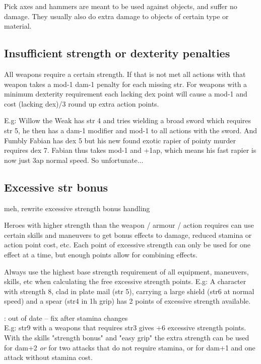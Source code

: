 Pick axes and hammers are meant to be used against objects, and suffer no damage. They usually also do extra damage to objects of certain type or material.


\subsection*{Insufficient strength or dexterity penalties}
All weapons require a certain strength. If that is not met all actions with that weapon takes a mod-1 dam-1 penalty for each missing str. For weapons with a minimum dexterity requirement each lacking dex point will cause a mod-1 and cost (lacking dex)/3 round up extra action points.

E.g: Willow the Weak has str 4 and tries wielding a broad sword which requires str 5, he then has a dam-1 modifier and mod-1 to all actions with the sword.
And Fumbly Fabian has dex 5 but his new found exotic rapier of pointy murder requires dex 7. Fabian thus takes mod-1 and +1ap, which means his fast rapier is now just 3ap normal speed. So unfortunate...


\subsection*{Excessive str bonus}
\todo meh, rewrite excessive strength bonus handling

Heroes with higher strength than the weapon / armour / action requires can use certain skills and maneuvers to get bonus effects to damage, reduced stamina or action point cost, etc. Each point of excessive strength can only be used for one effect at a time, but enough points allow for combining effects.

Always use the highest base strength requirement of all equipment, maneuvers, skills, etc when calculating the free excessive strength points.
E.g: A character with strength 8, clad in plate mail (str 5), carrying a large shield (str6 at normal speed) and a spear (str4 in 1h grip) has 2 points of excessive strength available.

\todo: out of date -- fix after stamina changes\\
E.g: str9 with a weapons that requires str3 gives +6 excessive strength points. With the skills "strength bonus" and "easy grip" the extra strength can be used for dam+2 \emph{or} for two attacks that do not require stamina, or for dam+1 and one attack without stamina cost.

